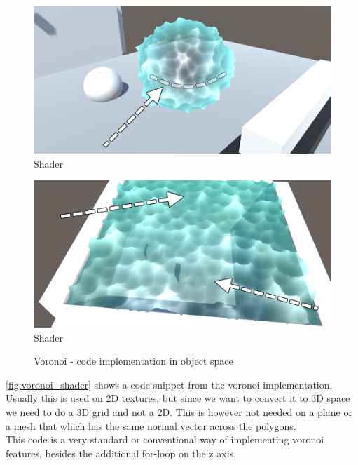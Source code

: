 \documentclass{article}
\begin{document}
\begin{figure}[H]
    \centering
    \includegraphics[width=\textwidth]{img/shader_3}
    \caption{Shader}
    \label{fig:shader_3}
\end{figure}
\begin{figure}[H]
    \centering
    \includegraphics[width=\textwidth]{img/shader_4}
    \caption{Shader}
    \label{fig:shader_4}
\end{figure}

\begin{figure}[H]
    \centering
    
    \caption{Voronoi - code implementation in object space}
    \label{fig:voronoi_shader}
\end{figure}
\autoref{fig:voronoi_shader} shows a code snippet from the voronoi implementation. Usually this is used on 2D textures, but since we want to convert it to 3D space we need to do a 3D grid and not a 2D. This is however not needed on a plane or a mesh that which has the same normal vector across the polygons.\\
This code is a very standard or conventional way of implementing voronoi features, besides the additional for-loop on the z axis.\\
\end{document}
